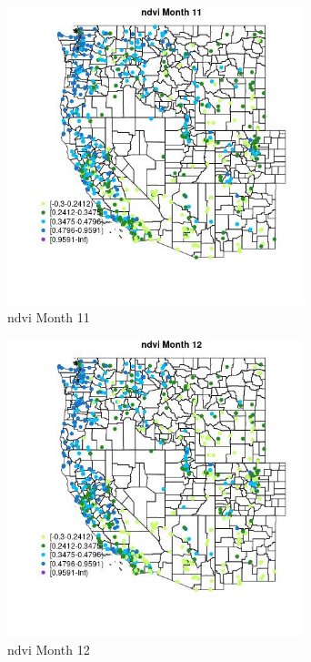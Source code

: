 \begin{figure} 
\centering  
\includegraphics[width=0.77\textwidth]{Code_Outputs/Report_ML_input_PM25_Step4_part_e_de_duplicated_aves_compiled_2019-05-21wNAs_MapObsMo11ndvi.jpg} 
\caption{\label{fig:Report_ML_input_PM25_Step4_part_e_de_duplicated_aves_compiled_2019-05-21wNAsMapObsMo11ndvi}ndvi Month 11} 
\end{figure} 
 

\begin{figure} 
\centering  
\includegraphics[width=0.77\textwidth]{Code_Outputs/Report_ML_input_PM25_Step4_part_e_de_duplicated_aves_compiled_2019-05-21wNAs_MapObsMo12ndvi.jpg} 
\caption{\label{fig:Report_ML_input_PM25_Step4_part_e_de_duplicated_aves_compiled_2019-05-21wNAsMapObsMo12ndvi}ndvi Month 12} 
\end{figure} 
 
